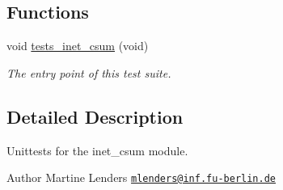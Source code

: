 \subsection*{Functions}
\begin{DoxyCompactItemize}
\item 
void \hyperlink{group__unittests_gadfd01b88a3279960c0a209c588d7e733}{tests\+\_\+inet\+\_\+csum} (void)
\begin{DoxyCompactList}\small\item\em The entry point of this test suite. \end{DoxyCompactList}\end{DoxyCompactItemize}


\subsection{Detailed Description}
Unittests for the {\ttfamily inet\+\_\+csum} module. 

\begin{DoxyAuthor}{Author}
Martine Lenders \href{mailto:mlenders@inf.fu-berlin.de}{\tt mlenders@inf.\+fu-\/berlin.\+de} 
\end{DoxyAuthor}
